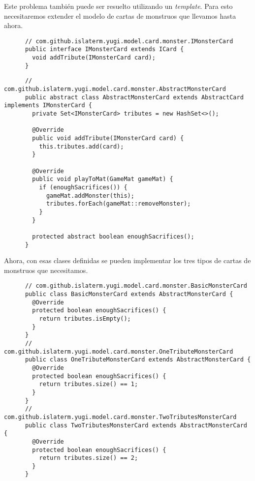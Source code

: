   \begin{Answer}[ref={ex:template-2}]
    Este problema también puede ser resuelto utilizando un \textit{template}.
    Para esto necesitaremos extender el modelo de cartas de monstruos que llevamos hasta 
    ahora.
    \begin{verbatim}
      // com.github.islaterm.yugi.model.card.monster.IMonsterCard
      public interface IMonsterCard extends ICard {
        void addTribute(IMonsterCard card);
      }
    \end{verbatim}

    \begin{verbatim}
      // com.github.islaterm.yugi.model.card.monster.AbstractMonsterCard
      public abstract class AbstractMonsterCard extends AbstractCard implements IMonsterCard {
        private Set<IMonsterCard> tributes = new HashSet<>();

        @Override
        public void addTribute(IMonsterCard card) {
          this.tributes.add(card);
        }
      
        @Override
        public void playToMat(GameMat gameMat) {
          if (enoughSacrifices()) {
            gameMat.addMonster(this);
            tributes.forEach(gameMat::removeMonster);
          }
        }

        protected abstract boolean enoughSacrifices();
      }
    \end{verbatim}

    Ahora, con esas clases definidas se pueden implementar los tres tipos de cartas de 
    monstruos que necesitamos.
    \begin{verbatim}
      // com.github.islaterm.yugi.model.card.monster.BasicMonsterCard
      public class BasicMonsterCard extends AbstractMonsterCard {
        @Override
        protected boolean enoughSacrifices() {
          return tributes.isEmpty();
        }
      }
      // com.github.islaterm.yugi.model.card.monster.OneTributeMonsterCard
      public class OneTributeMonsterCard extends AbstractMonsterCard {
        @Override
        protected boolean enoughSacrifices() {
          return tributes.size() == 1;
        }
      }
      // com.github.islaterm.yugi.model.card.monster.TwoTributesMonsterCard
      public class TwoTributesMonsterCard extends AbstractMonsterCard {
        @Override
        protected boolean enoughSacrifices() {
          return tributes.size() == 2;
        }
      }
    \end{verbatim}
  \end{Answer}